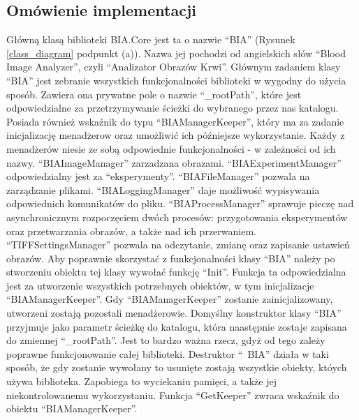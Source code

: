 \documentclass{article}
\begin{document}
        \subsection{Omówienie implementacji}
        {
            \label{omowienieimplementacji}
            \Large
            \justifying
            \quad
            Główną klasą biblioteki BIA.Core jest ta o nazwie ``BIA''
            (Rysunek \ref{class_diagram} podpunkt (a)).
            Nazwa jej pochodzi od angielskich słów ``Blood Image Analyzer'', czyli ``Analizator Obrazów Krwi''.
            Głównym zadaniem klasy ``BIA'' jest zebranie wszystkich funkcjonalności biblioteki w wygodny do użycia sposób.
            Zawiera ona prywatne pole o nazwie ``\_rootPath'', które jest odpowiedzialne za przetrzymywanie ścieżki do wybranego przez nas katalogu.
            Posiada również wskaźnik do typu ``BIAManagerKeeper'', który ma za zadanie inicjalizację menadżerow oraz umożliwić ich późniejsze wykorzystanie.
            Każdy z menadżerów niesie ze sobą odpowiednie funkcjonalności - w zależności od ich nazwy.
            ``BIAImageManager'' zarzadzana obrazami.
            ``BIAExperimentManager'' odpowiedzialny jest za ``eksperymenty''.
            ``BIAFileManager'' pozwala na zarządzanie plikami.
            ``BIALoggingManager'' daje możliwość wypisywania odpowiednich komunikatów do pliku.
            ``BIAProcessManager'' sprawuje pieczę nad asynchronicznym rozpoczęciem dwóch procesów: przygotowania eksperymentów oraz przetwarzania obrazów,
            a także nad ich przerwaniem.
            ``TIFFSettingsManager'' pozwala na odczytanie, zmianę oraz zapisanie ustawień obrazów.
            Aby poprawnie skorzystać z funkcjonalności klasy ``BIA'' należy po stworzeniu obiektu tej klasy wywołać funkcję ``Init''.
            Funkcja ta odpowiedzialna jest za utworzenie wszystkich potrzebnych obiektów, w tym inicjalizacje ``BIAManagerKeeper''.
            Gdy ``BIAManagerKeeper'' zostanie zainicjalizowany, utworzeni zostają pozostali menadżerowie.
            Domyślny konstruktor klasy ``BIA'' przyjmuje jako parametr ścieżkę do katalogu, która naastępnie zostaje zapisana do zmiennej ``\_rootPath''.
            Jest to bardzo ważna rzecz, gdyż od tego zależy poprawne funkcjonowanie całej biblioteki.
            Destruktor ``~BIA'' działa w taki sposób, że gdy zostanie wywołany to usunięte zostają wszystkie obiekty, któych używa biblioteka.
            Zapobiega to wyciekaniu pamięci, a także jej niekontrolowanemu wykorzystaniu.
            Funkcja ``GetKeeper'' zwraca wskaźnik do obiektu ``BIAManagerKeeper''.
}
\end{document}
